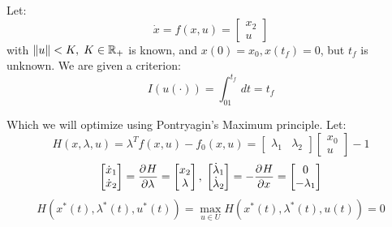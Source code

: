 {
    Let:
    \begin{equation}
        \dot{x} = f(x,u) = \begin{bmatrix}
            x_2 \\ u
        \end{bmatrix}
    \end{equation}
    with $\lVert u\rVert < K, \; K\in \mathbb{R}_+$ is known, and $x(0) =x_0,  x(t_f)  = 0$, but  $t_f$ is unknown.
    We are given a criterion:
    \begin{equation}
        I(u(\cdot)) = \int^{t_f}_01dt = t_f
    \end{equation}

    Which we will optimize using Pontryagin's Maximum principle.
    Let:
    \begin{equation}
        H(x,\lambda,u) = \lambda^{T}f(x,u) - f_0(x,u) = \begin{bmatrix}
            \lambda_1 & \lambda_2
        \end{bmatrix} \begin{bmatrix}
            x_0  \\ u
        \end{bmatrix} -1 
    \end{equation}
    \begin{equation}
        \begin{bmatrix}
            \dot{x}_1 \\ \dot{x}_2
        \end{bmatrix} = \frac{\partial^{}H}{\partial\lambda^{}} = \begin{bmatrix}
        x_2  \\ \lambda
        \end{bmatrix}, \; \begin{bmatrix}
        \dot{\lambda}_1 \\ \dot{\lambda}_2
        \end{bmatrix} = - \frac{\partial^{}H}{\partial x^{}} = \begin{bmatrix}
          0\\  -\lambda_1 
        \end{bmatrix}
    \end{equation}
    \begin{equation}
        H(x^{*}(t),\lambda^{*}(t),u^{*}(t)) = \max_{u \in U} H(x^{*}(t),\lambda^{*}(t),u(t)) = 0
    \end{equation}


}
